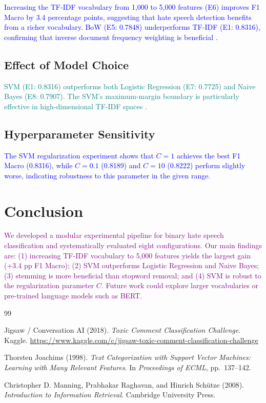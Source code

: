\documentclass[11pt,a4paper,twocolumn]{article}
\newcommand{\authorone}[1]{\textcolor{blue}{#1}}      %
\newcommand{\authortwo}[1]{\textcolor{teal}{#1}}      %
\newcommand{\joint}[1]{\textcolor{purple}{#1}}        %
\begin{document}
\authorone{
Increasing the TF-IDF vocabulary from 1{,}000 to 5{,}000 features (E6)
improves F1 Macro by 3.4 percentage points, suggesting that hate speech
detection benefits from a richer vocabulary.
BoW (E5: 0.7848) underperforms TF-IDF (E1: 0.8316), confirming that
inverse document frequency weighting is beneficial \citep{manning2008}.
}

\subsection{Effect of Model Choice}

\authortwo{
SVM (E1: 0.8316) outperforms both Logistic Regression (E7: 0.7725) and
Naive Bayes (E8: 0.7907).
The SVM's maximum-margin boundary is particularly effective in
high-dimensional TF-IDF spaces \citep{joachims1998}.
}

\subsection{Hyperparameter Sensitivity}

\authorone{
The SVM regularization experiment shows that $C=1$ achieves the best F1 Macro (0.8316), while $C=0.1$
(0.8189) and $C=10$ (0.8222) perform slightly worse, indicating robustness
to this parameter in the given range.
}


\section{Conclusion}

\joint{
We developed a modular experimental pipeline for binary hate speech
classification and systematically evaluated eight configurations.
Our main findings are: (1) increasing TF-IDF vocabulary to 5{,}000 features
yields the largest gain (+3.4 pp F1 Macro); (2) SVM outperforms Logistic
Regression and Naive Bayes; (3) stemming is more beneficial than stopword
removal; and (4) SVM is robust to the regularization parameter $C$.
Future work could explore larger vocabularies or pre-trained language models
such as BERT.
}
\newpage

\begin{thebibliography}{99}

Jigsaw / Conversation AI (2018).
\textit{Toxic Comment Classification Challenge}.
Kaggle.
\url{https://www.kaggle.com/c/jigsaw-toxic-comment-classification-challenge}

Thorsten Joachims (1998).
\textit{Text Categorization with Support Vector Machines: Learning with Many
Relevant Features}.
In \textit{Proceedings of ECML}, pp.~137--142.

Christopher D. Manning, Prabhakar Raghavan, and Hinrich Schütze (2008).
\textit{Introduction to Information Retrieval}.
Cambridge University Press.

\end{thebibliography}
\end{document}

